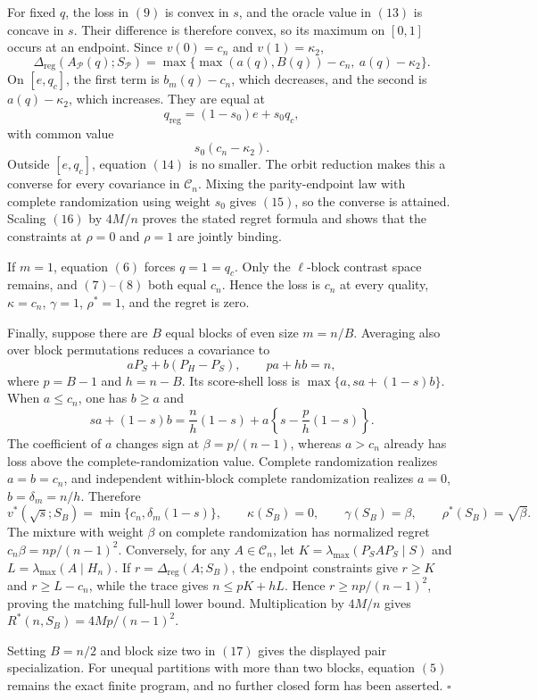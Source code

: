 For fixed \(q\), the loss in \((9)\) is convex in \(s\), and the oracle value in \((13)\) is concave in \(s\).  Their difference is therefore convex, so its maximum on \([0,1]\) occurs at an endpoint.  Since \(v(0)=c_n\) and \(v(1)=\kappa_2\),
\[
\Delta_{\mathrm{reg}}(A_{\mathcal P}(q);S_{\mathcal P})
=\max\{\max(a(q),B(q))-c_n,\ a(q)-\kappa_2\}.
\tag{14}
\]
On \([e,q_c]\), the first term is \(b_m(q)-c_n\), which decreases, and the second is \(a(q)-\kappa_2\), which increases.  They are equal at
\[
q_{\mathrm{reg}}=(1-s_0)e+s_0q_c,
\tag{15}
\]
with common value
\[
s_0(c_n-\kappa_2).
\tag{16}
\]
Outside \([e,q_c]\), equation \((14)\) is no smaller.  The orbit reduction makes this a converse for every covariance in \(\mathcal C_n\).  Mixing the parity-endpoint law with complete randomization using weight \(s_0\) gives \((15)\), so the converse is attained.  Scaling \((16)\) by \(4M/n\) proves the stated regret formula and shows that the constraints at \(\rho=0\) and \(\rho=1\) are jointly binding.

If \(m=1\), equation \((6)\) forces \(q=1=q_c\).  Only the \(\ell\)-block contrast space remains, and \((7)\)--\((8)\) both equal \(c_n\).  Hence the loss is \(c_n\) at every quality, \(\kappa=c_n\), \(\gamma=1\), \(\rho^*=1\), and the regret is zero.

Finally, suppose there are \(B\) equal blocks of even size \(m=n/B\).  Averaging also over block permutations reduces a covariance to
\[
aP_S+b(P_H-P_S),
\qquad pa+hb=n,
\]
where \(p=B-1\) and \(h=n-B\).  Its score-shell loss is \(\max\{a,sa+(1-s)b\}\).  When \(a\leq c_n\), one has \(b\geq a\) and
\[
sa+(1-s)b
=\frac{n}{h}(1-s)+a\left\{s-\frac{p}{h}(1-s)\right\}.
\]
The coefficient of \(a\) changes sign at \(\beta=p/(n-1)\), whereas \(a>c_n\) already has loss above the complete-randomization value.  Complete randomization realizes \(a=b=c_n\), and independent within-block complete randomization realizes \(a=0\), \(b=\delta_m=n/h\).  Therefore
\[
v^*(\sqrt{s};S_B)=\min\{c_n,\delta_m(1-s)\},
\qquad
\kappa(S_B)=0,
\qquad
\gamma(S_B)=\beta,
\qquad
\rho^*(S_B)=\sqrt\beta.
\tag{17}
\]
The mixture with weight \(\beta\) on complete randomization has normalized regret \(c_n\beta=np/(n-1)^2\).  Conversely, for any \(A\in\mathcal C_n\), let \(K=\lambda_{\max}(P_SAP_S\mid S)\) and \(L=\lambda_{\max}(A\mid H_n)\).  If \(r=\Delta_{\mathrm{reg}}(A;S_B)\), the endpoint constraints give \(r\geq K\) and \(r\geq L-c_n\), while the trace gives \(n\leq pK+hL\).  Hence \(r\geq np/(n-1)^2\), proving the matching full-hull lower bound.  Multiplication by \(4M/n\) gives \(R^*(n,S_B)=4Mp/(n-1)^2\).

Setting \(B=n/2\) and block size two in \((17)\) gives the displayed pair specialization.  For unequal partitions with more than two blocks, equation \((5)\) remains the exact finite program, and no further closed form has been asserted. \(\square\)
